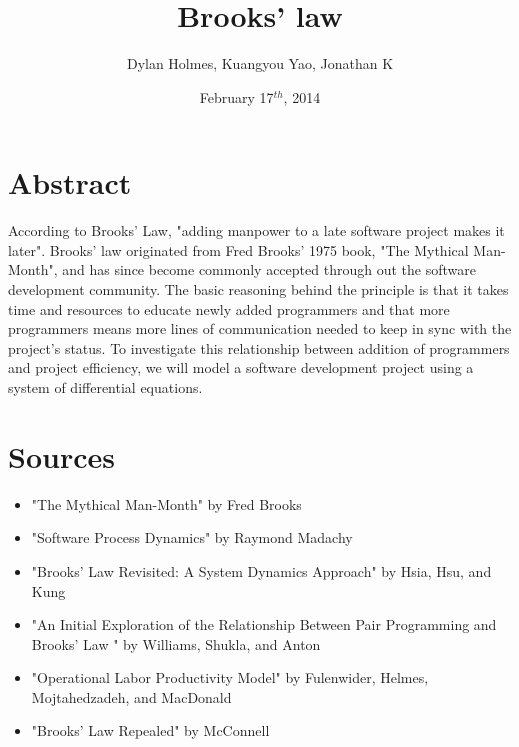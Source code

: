 \documentclass{article}
\author{Dylan Holmes, Kuangyou Yao, Jonathan K}
\title{Brooks' law}
\date{February 17$^{th}$, 2014}
\begin{document}
\maketitle



\section*{Abstract}
According to Brooks' Law, "adding manpower to a late software project makes it later". Brooks' law originated from Fred Brooks' 1975 book, "The Mythical Man-Month", and has since become commonly accepted through out the software development community. The basic reasoning behind the principle is that it takes time and resources to educate newly added programmers and that more programmers means more lines of communication needed to keep in sync with the project's status. To investigate this relationship between addition of programmers and project efficiency, we will model a software development project using a system of differential equations.

\section*{Sources}
\begin{itemize}
    \item "The Mythical Man-Month" by Fred Brooks
    \item "Software Process Dynamics" by Raymond Madachy
    \item "Brooks’ Law Revisited: A System Dynamics Approach" by Hsia, Hsu, and Kung
    \item "An Initial Exploration of the Relationship Between Pair Programming and Brooks’ Law
" by Williams, Shukla, and Anton
    \item "Operational Labor Productivity Model" by Fulenwider, Helmes, Mojtahedzadeh, and MacDonald
    \item "Brooks’ Law Repealed" by McConnell
\end{itemize}
\end{document}
